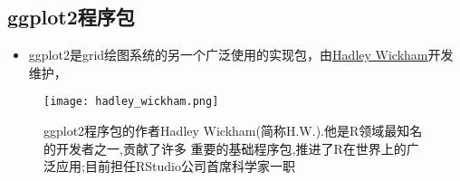 


\subsection{ggplot2程序包}
\begin{frame}[t]{\subsecname}{}
\begin{itemize}
\item ggplot2是grid绘图系统的另一个广泛使用的实现包，由\href{http://hadley.nz/}{\uline{Hadley Wickham}}开发维护， 
\end{itemize}
\begin{figure}[ht]
  \centering
  \texttt{[image: hadley\_wickham.png]}
  \caption{ggplot2程序包的作者Hadley Wickham(简称H.W.).他是R领域最知名的开发者之一,贡献了许多
重要的基础程序包,推进了R在世界上的广泛应用;目前担任RStudio公司首席科学家一职}
\end{figure}
\end{frame}

